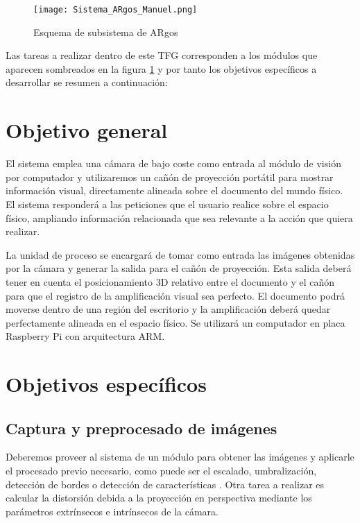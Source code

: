 \begin{figure}[h]
  \begin{center}
    \texttt{[image: Sistema\_ARgos\_Manuel.png]}
    \caption{Esquema de subsistema de ARgos}
    \label{fig:subsistemas_argos}
  \end{center}
\end{figure}

Las tareas a realizar dentro de este TFG corresponden a los módulos que aparecen sombreados en la figura \ref{fig:subsistemas_argos} y por tanto los objetivos específicos a desarrollar se resumen a continuación:   



\section{Objetivo general}
El sistema emplea una cámara de bajo coste como entrada al módulo de visión por computador y utilizaremos un cañón de proyección portátil para mostrar información visual, directamente alineada sobre el documento del mundo físico. El sistema responderá a las peticiones que el usuario realice sobre el espacio físico, ampliando información relacionada que sea relevante a la acción que quiera realizar.

La unidad de proceso se encargará de tomar como entrada las imágenes obtenidas por la cámara y generar la salida para el cañón de proyección. Esta salida deberá tener en cuenta el posicionamiento 3D relativo entre el documento y el cañón para que el registro de la amplificación visual sea perfecto. El documento podrá moverse dentro de una región del escritorio y la amplificación deberá quedar perfectamente alineada en el espacio físico. Se utilizará un computador en placa Raspberry Pi con arquitectura ARM.

\section{Objetivos específicos}

\subsection{Captura y preprocesado de imágenes}
Deberemos proveer al sistema de un módulo para obtener las imágenes y aplicarle el procesado previo necesario, como puede ser el escalado, umbralización, detección de bordes o detección de características \cite{ortiz} \cite{Bay}. Otra tarea a realizar es calcular la distorsión debida a la proyección en perspectiva mediante los parámetros extrínsecos e intrínsecos de la cámara.


